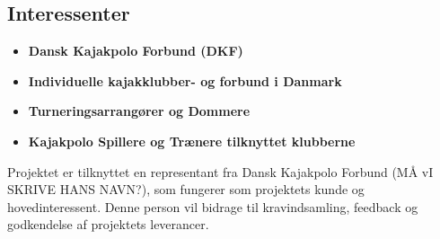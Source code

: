\subsection{Interessenter}
\begin{itemize}
Projektets primære interessenter omfatter:
    \item \textbf{Dansk Kajakpolo Forbund (DKF)}
    \item \textbf{Individuelle kajakklubber- og forbund i Danmark}
    \item \textbf{Turneringsarrangører og Dommere}
    \item \textbf{Kajakpolo Spillere og Trænere tilknyttet klubberne}
\end{itemize}
Projektet er tilknyttet en representant fra Dansk Kajakpolo Forbund (MÅ vI SKRIVE HANS NAVN?), som fungerer som
projektets kunde og hovedinteressent. Denne person vil bidrage til kravindsamling, feedback og godkendelse af
projektets leverancer.